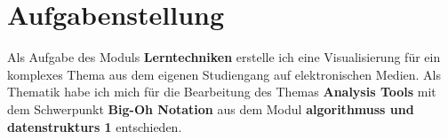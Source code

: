 \newpage
\section{Aufgabenstellung}

Als Aufgabe des Moduls \textbf{Lerntechniken} erstelle ich eine Visualisierung für ein komplexes Thema aus dem eigenen Studiengang auf elektronischen Medien.
Als Thematik habe ich mich für die Bearbeitung des Themas \textbf{Analysis Tools} mit dem Schwerpunkt \textbf{Big-Oh Notation} aus dem Modul \textbf{\glspl{algorithmus} und \glspl{datenstruktur} 1} entschieden.